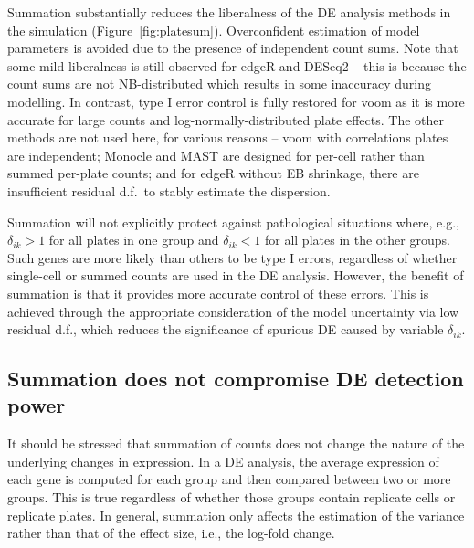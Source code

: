 \documentclass[oupdraft]{bio}
\begin{document}
Summation substantially reduces the liberalness of the DE analysis methods in the simulation (Figure~\ref{fig:platesum}).
Overconfident estimation of model parameters is avoided due to the presence of independent count sums.
Note that some mild liberalness is still observed for edgeR and DESeq2 
    -- this is because the count sums are not NB-distributed which results in some inaccuracy during modelling.
In contrast, type I error control is fully restored for voom as it is more accurate for large counts and log-normally-distributed plate effects.
The other methods are not used here, for various reasons -- voom with correlations  plates are independent;
    Monocle and MAST are designed for per-cell rather than summed per-plate counts;
    and for edgeR without EB shrinkage, there are insufficient residual d.f.\ to stably estimate the dispersion.

Summation will not explicitly protect against pathological situations where, e.g., $\delta_{ik} > 1$ for all plates in one group and $\delta_{ik} < 1$ for all plates in the other groups.
Such genes are more likely than others to be type I errors, regardless of whether single-cell or summed counts are used in the DE analysis.
However, the benefit of summation is that it provides more accurate control of these errors.
This is achieved through the appropriate consideration of the model uncertainty via low residual d.f., which reduces the significance of spurious DE caused by variable $\delta_{ik}$.

\subsection{Summation does not compromise DE detection power}
It should be stressed that summation of counts does not change the nature of the underlying changes in expression.
In a DE analysis, the average expression of each gene is computed for each group and then compared between two or more groups.
This is true regardless of whether those groups contain replicate cells or replicate plates. 
In general, summation only affects the estimation of the variance rather than that of the effect size, i.e., the log-fold change.
\end{document}

